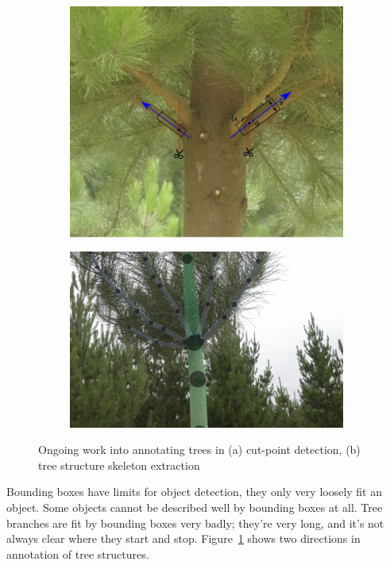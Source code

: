 \begin{figure}[h!]
\begin{subfigure}[t]{1.0\linewidth}
  \centering
  \includegraphics[width=0.8\linewidth]{figures/future/tree_cutpoint.pdf}
  \caption{} 
\end{subfigure}

\begin{subfigure}[t]{1.0\linewidth}
  \centering
  \includegraphics[width=0.8\linewidth]{figures/future/tree_branches.jpg}
  \caption{} 
\end{subfigure}
\caption{Ongoing work into annotating trees in (a) cut-point detection, (b) tree structure skeleton extraction }
\label {fig:future_trees}
\end{figure}

Bounding boxes have limits for object detection, they only very loosely fit an object. Some objects cannot be described well by bounding boxes at all. Tree branches are fit by bounding boxes very badly; they're very long, and it's not always clear where they start and stop. Figure~\ref{fig:future_trees} shows two directions in annotation of tree structures. 

